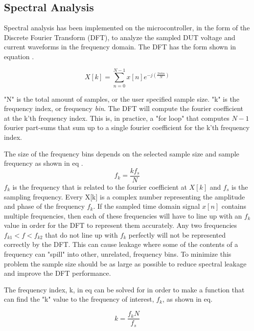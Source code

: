 \subsection{Spectral Analysis} \label{subsec:SpectralAnalysis} 

Spectral analysis has been implemented on the microcontroller, in the form of the Discrete Fourier Transform (DFT), to analyze the sampled DUT voltage and current waveforms in the frequency domain. The DFT has the form shown in equation .

\begin{equation}\label{eq:4_7_2_SA1}
    X[k] = \sum_{n=0}^{N-1} x[n] e^{-j(\frac{2\pi kn}{N})}
\end{equation}

"N" is the total amount of samples, or the user specified sample size. "k" is the frequency index, or frequency \textit{bin}. The DFT will compute the fourier coefficient at the k'th frequency index. This is, in practice, a "for loop" that computes $N-1$ fourier part-sums that sum up to a single fourier coefficient for the k'th frequency index.

The size of the frequency bins depends on the selected sample size and sample frequency as shown in eq .
\begin{equation}\label{eq:4_7_2_SA3}
    f_k = \frac{kf_s}{N} 
\end{equation}
$f_k$ is the frequency that is related to the fourier coefficient at $X[k]$ and $f_s$ is the sampling frequency. Every X[k] is a complex number representing the amplitude and phase of the frequency $f_k$. If the sampled time domain signal $x[n]$ contains multiple frequencies, then each of these frequencies will have to line up with an $f_k$ value in order for the DFT to represent them accurately. Any two frequencies $f_{k1} < f < f_{k2}$ that do not line up with $f_k$ perfectly will not be represented correctly by the DFT. This can cause leakage where some of the contents of a frequency can "spill" into other, unrelated, frequency bins. To minimize this problem the sample size should be as large as possible to reduce spectral leakage and improve the DFT performance.

The frequency index, k, in eq  can be solved for in order to make a function that can find the "k" value to the frequency of interest, $f_k$, as shown in eq.

\begin{equation}\label{eq:4_7_2_SA4}
    k = \frac{f_k N}{f_s} 
\end{equation}

